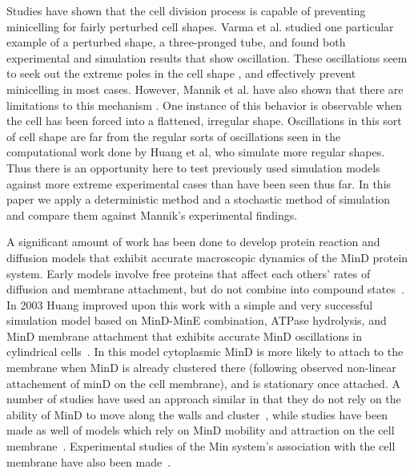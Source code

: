 \documentclass[letterpaper,twocolumn,amsmath,amssymb,pre]{revtex4-1}
\begin{document}
Studies have shown that the cell division process is capable of
preventing minicelling for fairly perturbed cell
shapes\cite{touhami2006temperature}. Varma et al. studied one
particular example of a perturbed shape, a three-pronged tube, and
found both experimental and simulation results\cite{varma2008min} that
show oscillation. These oscillations seem to seek out the extreme
poles in the cell shape\cite{corbin2002exploring}
\cite{juarez2010changes}, and effectively prevent minicelling in most
cases. However, Mannik et al. have also shown that there are
limitations to this mechanism\cite{mannik2010bacteria}
\cite{mannik2009bacterial}. One instance of this behavior is
observable when the cell has been forced into a flattened, irregular
shape. Oscillations in this sort of cell shape are far from the
regular sorts of oscillations seen in the computational work done by
Huang et al\cite{huang2003dynamic}, who simulate more regular
shapes. Thus there is an opportunity here to test previously used
simulation models against more extreme experimental cases than have
been seen thus far.  In this paper we apply a deterministic method and
a stochastic method of simulation and compare them against Mannik's
experimental findings.

A significant amount of work has been done to develop protein reaction
and diffusion models that exhibit accurate macroscopic dynamics of the
MinD protein system. Early models involve free proteins that affect
each others' rates of diffusion and membrane attachment, but do not
combine into compound states~\cite{meinhardt2001pattern}.  In 2003
Huang improved upon this work with a simple and very successful
simulation model based on MinD-MinE combination, ATPase hydrolysis,
and MinD membrane attachment that exhibits accurate MinD oscillations
in cylindrical cells~\cite{huang2003dynamic}. In this model
cytoplasmic MinD is more likely to attach to the membrane when MinD is
already clustered there (following observed non-linear attachement of
minD on the cell membrane), and is stationary once attached.  A number
of studies have used an approach similar in that they do not rely on
the ability of MinD to move along the walls and
cluster~\cite{kruse2007experimentalist, meinhardt2001pattern,
  drew2005polymerization, fange2006noise, kerr2006division}, while
studies have been made as well of models which rely on MinD mobility
and attraction on the cell membrane~\cite{kruse2002dynamic,
  howard2005cellular}.  Experimental studies of the Min system's
association with the cell membrane have also been
made~\cite{hsieh2010direct}\cite{mileykovskaya2003effects}.
\end{document}
